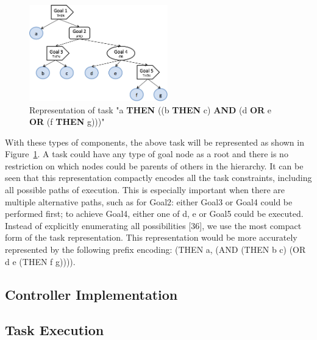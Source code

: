 \documentclass[letterpaper, 10 pt, conference]{ieeeconf}  %
\begin{document}
\begin{figure}
\centering
  \includegraphics[width=6cm]{task_img.png}
\caption{Representation of task "a {\bf THEN} ((b {\bf THEN} c) {\bf AND} (d {\bf OR} e {\bf OR} (f {\bf THEN} g)))"}
\label{fig:task_representation}       %
\end{figure}
With these types of components, the above task will be represented as shown in Figure~\ref{fig:task_representation}. A task could have any type of goal node as a root and there is no restriction on which nodes could be parents of others in the hierarchy. It can be seen that this representation compactly encodes all the task constraints, including all possible paths of execution. This is especially important when there are multiple alternative paths, such as for Goal2: either Goal3 or Goal4 could be performed first; to achieve Goal4, either one of d, e or Goal5 could be executed. Instead of explicitly enumerating all possibilities [36], we use the most compact form of the task representation. This representation would be more accurately represented by the following prefix encoding: (THEN a, (AND (THEN b c) (OR d e (THEN f g)))).

\subsection{Controller Implementation}
\label{implementation}

\subsection{Task Execution}
\label{execution}
\end{document}
